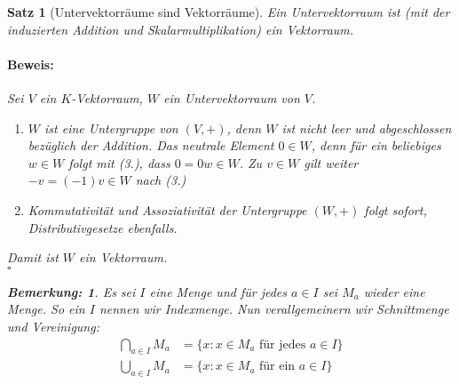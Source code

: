 \documentclass{report}
\theoremstyle{customrem}
\newtheorem*{bem}{Bemerkung:}
\theoremstyle{customdef}
\newtheorem{satz}[definition]{Satz}
\renewenvironment{proof}{\vspace{-.75cm}\paragraph{Beweis: }}{\vspace{-.5cm}\hfill$\square$}
\begin{document}
	\begin{satz}[Untervektorräume sind Vektorräume]
		Ein Untervektorraum ist (mit der induzierten Addition und Skalarmultiplikation) ein Vektorraum.\\
		
		\begin{proof}
			Sei $V$ ein $K$-Vektorraum, $W$ ein Untervektorraum von $V$.
			\begin{enumerate}
				\item $W$ ist eine Untergruppe von $(V, +)$, denn $W$ ist nicht leer und abgeschlossen bezüglich der Addition. Das neutrale Element $0 \in W$, denn für ein beliebiges $w \in W$ folgt mit (3.), dass $0 = 0w \in W$. Zu $v \in W$ gilt weiter $-v = (-1)v \in W$ nach (3.)
				\item Kommutativität und Assoziativität der Untergruppe $(W, +)$ folgt sofort, Distributivgesetze ebenfalls.
			\end{enumerate}
			Damit ist $W$ ein Vektorraum.\\
		\end{proof}
		\vspace{.3cm}
		\begin{bem}
			Es sei $I$ eine Menge und für jedes $a \in I$ sei $M_a$ wieder eine Menge. So ein $I$ nennen wir Indexmenge. Nun verallgemeinern wir Schnittmenge und Vereinigung:
			\begin{align*}
				\bigcap_{a\in I} M_a &= \{x : x \in M_a \text{ für jedes\ } a \in I\}\\
				\bigcup_{a\in I} M_a &= \{x : x \in M_a \text{ für ein\ } a \in I\}
			\end{align*}
		\end{bem}
	\end{satz}
	
\end{document}
